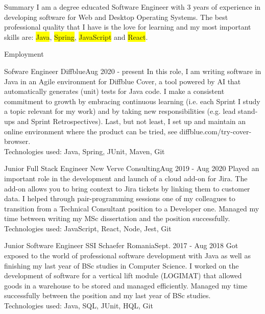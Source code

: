 \documentclass[]{mcdowellcv}
\begin{document}
	\makeheader

  \begin{cvsection}{Summary}
    I am a degree educated Software Engineer with 3 years of experience in developing software for Web and Desktop Operating Systems. The best professional quality that I have is the love for learning and my most important skills are: \colorbox{yellow}{Java}, \colorbox{yellow}{Spring}, \colorbox{yellow}{JavaScript} and \colorbox{yellow}{React}.
  \end{cvsection}

  \begin{cvsection}{Employment}
    \begin{cvsubsection}{Sofware Engineer }{Diffblue}{Aug 2020 - present}
      In this role, I am writing software in Java in an Agile environment for Diffblue Cover, a tool powered by AI that automatically generates (unit) tests for Java code. I make a consistent commitment to growth by embracing continuous learning (i.e. each Sprint I study a topic relevant for my work) and by taking new responsibilities (e.g. lead stand-ups and Sprint Retrospectives). Last, but not least, I set up and maintain an online environment where the product can be tried, see diffblue.com/try-cover-browser.
      \\Technologies used: Java, Spring, JUnit, Maven, Git
		\end{cvsubsection}

		\begin{cvsubsection}{Junior Full Stack Engineer }{New Verve Consulting}{Aug 2019 - Aug 2020}
      Played an important role in the development and launch of a cloud add-on for Jira. The add-on allows you to bring context to Jira tickets by linking them to customer data. I helped through pair-programming sessions one of my colleagues to transition from a Technical Consultant position to a Developer one. Managed my time between writing my MSc dissertation and the position successfully.
      \\Technologies used: JavaScript, React, Node, Jest, Git
		\end{cvsubsection}

		\begin{cvsubsection}{Junior Software Engineer }{SSI Schaefer Romania}{Sept. 2017 - Aug 2018}
      Got exposed to the world of professional software development with Java as well as finishing my last year of BSc studies in Computer Science. I worked on the development of software for a vertical lift module (LOGIMAT) that allowed goods in a warehouse to be stored and managed efficiently. Managed my time successfully between the position and my last year of BSc studies.
      \\Technologies used: Java, SQL, JUnit, HQL, Git
		\end{cvsubsection}
		
  \end{cvsection}
\end{document}
